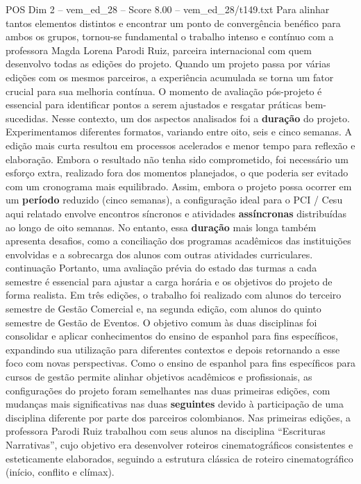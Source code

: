 \begin{textsample}{POS Dim 2 – vem\_ed\_28 – Score 8.00 – vem\_ed\_28/t149.txt}
Para alinhar tantos elementos distintos e encontrar um ponto de convergência benéfico para ambos os grupos, tornou-se fundamental o trabalho intenso e contínuo com a professora Magda Lorena Parodi Ruiz, parceira internacional com quem desenvolvo todas as edições do projeto.
Quando um projeto passa por várias edições com os mesmos parceiros, a experiência acumulada se torna um fator crucial para sua melhoria contínua.
O momento de avaliação pós-projeto é essencial para identificar pontos a serem ajustados e resgatar práticas bem-sucedidas.
Nesse contexto, um dos aspectos analisados foi a \textbf{duração} do projeto.
Experimentamos diferentes formatos, variando entre oito, seis e cinco semanas.
A edição mais curta resultou em processos acelerados e menor tempo para reflexão e elaboração.
Embora o resultado não tenha sido comprometido, foi necessário um esforço extra, realizado fora dos momentos planejados, o que poderia ser evitado com um cronograma mais equilibrado.
Assim, embora o projeto possa ocorrer em um \textbf{período} reduzido (cinco semanas), a configuração ideal para o PCI / Cesu aqui relatado envolve encontros síncronos e atividades \textbf{assíncronas} distribuídas ao longo de oito semanas.
No entanto, essa \textbf{duração} mais longa também apresenta desafios, como a conciliação dos programas acadêmicos das instituições envolvidas e a sobrecarga dos alunos com outras atividades curriculares. continuação Portanto, uma avaliação prévia do estado das turmas a cada semestre é essencial para ajustar a carga horária e os objetivos do projeto de forma realista.
Em três edições, o trabalho foi realizado com alunos do terceiro semestre de Gestão Comercial e, na segunda edição, com alunos do quinto semestre de Gestão de Eventos.
O objetivo comum às duas disciplinas foi consolidar e aplicar conhecimentos do ensino de espanhol para fins específicos, expandindo sua utilização para diferentes contextos e depois retornando a esse foco com novas perspectivas.
Como o ensino de espanhol para fins específicos para cursos de gestão permite alinhar objetivos acadêmicos e profissionais, as configurações do projeto foram semelhantes nas duas primeiras edições, com mudanças mais significativas nas duas \textbf{seguintes} devido à participação de uma disciplina diferente por parte dos parceiros colombianos.
Nas primeiras edições, a professora Parodi Ruiz trabalhou com seus alunos na disciplina “Escrituras Narrativas”, cujo objetivo era desenvolver roteiros cinematográficos consistentes e esteticamente elaborados, seguindo a estrutura clássica de roteiro cinematográfico (início, conflito e clímax).

\end{textsample}

